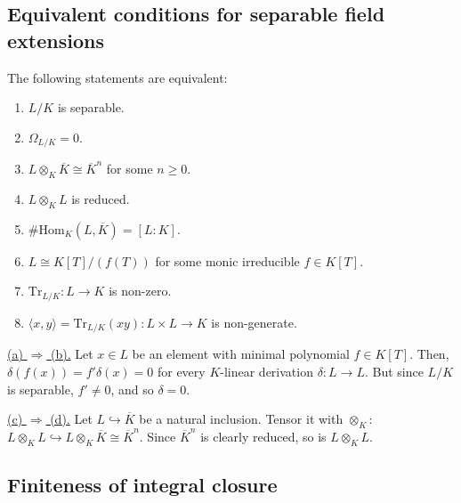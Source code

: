 \documentclass{template}
\begin{document}
\subsection{Equivalent conditions for separable field extensions}

\begin{proposition}
    The following statements are equivalent:
    \begin{enumerate}
        \item[(a)] $L/K$ is separable.
        \item[(b)] $\Omega_{L/K} = 0$.
        \item[(c)] $L \otimes_K \overline{K} \cong \overline{K}^n$ for some $n \geq 0$.
        \item[(d)] $L \otimes_K L$ is reduced.
        \item[(e)] $\#\text{Hom}_K(L, \overline{K}) = [L:K]$.
        \item[(f)] $L \cong K[T]/(f(T))$ for some monic irreducible $f \in K[T]$.
        \item[(g)] $\text{Tr}_{L/K}: L \to K$ is non-zero.
        \item[(h)] $\langle x, y \rangle = \text{Tr}_{L/K}(xy): L \times L \to K$ is
        non-generate.
    \end{enumerate}
\end{proposition}

\underline{(a) $\Rightarrow$ (b).} Let $x \in L$ be an element with minimal
polynomial $f \in K[T]$. Then, $\delta(f(x)) = f'\delta(x) = 0$ for every
$K$-linear derivation $\delta: L \to L$. But since $L/K$ is separable, $f' \neq
0$, and so $\delta = 0$.

\underline{(c) $\Rightarrow$ (d).} Let $L \hookrightarrow \overline{K}$ be a
natural inclusion. Tensor it with $\otimes_K$: $L \otimes_K L \hookrightarrow L
\otimes_K \overline{K} \cong \overline{K}^n$. Since $\overline{K}^n$ is clearly
reduced, so is $L \otimes_K L$.

\subsection{Finiteness of integral closure}
\end{document}
